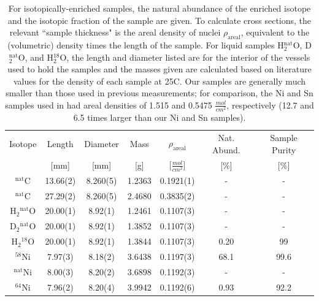 \begin{table}[ht]
    \caption[Physical characteristics of samples used for neutron \tot\
    measurements]
    {
        For isotopically-enriched samples, the natural abundance
        of the enriched isotope and the isotopic fraction of the sample are
        given. To calculate cross sections, the relevant ``sample thickness" is the areal
        density of nuclei $\rho_{\text{areal}}$, equivalent to
        the (volumetric) density times the length of the sample. For liquid
        samples H$_{2}^{\text{nat}}$O, D$_{2}^{\text{nat}}$O, and H$_{2}^{18}$O,
        the length and diameter listed are for the interior of the vessels
        used to hold the samples and the masses given are calculated based on 
        literature values for the density of each sample at 25\textdegree{}C.
        Our samples are generally much smaller than those used in previous
        measurements; for comparison, the Ni and Sn samples used in \cite{Abfalterer2001,
        Finlay1993} had areal densities of 1.515 and 0.5475
        $\frac{mol}{cm^{2}}$, respectively (12.7 and 6.5 times larger than our
        Ni and Sn samples).
    }
    \label{SampleCharacteristics}
    \begin{center}
        \begin{tabular}{ c c c c c c c }
            \hline
            Isotope & Length & Diameter
            & Mass & $\rho_{\text{areal}}$ & Nat. Abund. & Sample Purity\\
                 & [mm] & [mm] & [g] & [$\frac{mol}{cm^{2}}$] & [\%] & [\%]\\
            \hline

            $^{\text{nat}}$C & 13.66(2) & 8.260(5) & 1.2363
            & 0.1921(1) & - & -\\
            $^{\text{nat}}$C & 27.29(2) & 8.260(5) & 2.4680
            & 0.3835(2) & - & -\\

            H$_{2}$$^{\text{nat}}$O & 20.00(1) & 8.92(1) & 1.2461 & 0.1107(3) & - &
            - \\
            D$_{2}$$^{\text{nat}}$O & 20.00(1) & 8.92(1) & 1.3852 & 0.1107(3) & - &
            - \\
            H$_{2}$$^{18}$O & 20.00(1) & 8.92(1) & 1.3844 & 0.1107(3) & 0.20 & 99\\

            $^{58}$Ni & 7.97(3)& 8.18(2) &
            3.6438 & 0.1197(3)& 68.1 & 99.6 \\
            $^{\text{nat}}$Ni & 8.00(3) & 8.20(2) &
            3.6898 & 0.1192(3)& - & -\\
            $^{64}$Ni & 7.96(2) & 8.20(4) &
            3.9942 & 0.1192(6) & 0.93 & 92.2\\


\end{tabular}
\end{center}
\end{table}
